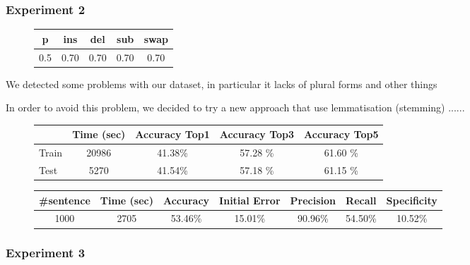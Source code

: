 \subsubsection{Experiment 2}
\begin{figure}[H]
	\centering
	\begin{tabular}{ccccc}
		\toprule
		p 				 & ins 				 	& del  				&  sub 			   &   swap\\ \midrule
		\num{0.5} & \num{0,70} & \num{0,70}  & \num{0,70} & \num{0,70}\\
		\bottomrule
	\end{tabular}
	\label{tab:error_model2}
\end{figure}

We detected some problems with our dataset, in particular it lacks of plural forms and other things

In order to avoid this problem, we decided to try a new approach that use lemmatisation (stemming) ......

\begin{figure}[H]
	\centering
	\begin{tabular}{lcccc}
		\toprule
		& Time (sec)  & Accuracy Top1 & Accuracy Top3  &  Accuracy Top5 \\
		\midrule
		Train & \num{20986} & \num{41,38}\%  & \num{57,28} \% & \num{61,60} \% \\
		Test &	\num{5270}  & \num{41,54}\%  & \num{57,18} \% & \num{61,15} \%  \\
		\bottomrule
	\end{tabular}
	\label{tab:typo-eval2}
\end{figure}


\begin{figure}[H]
	\centering
	\begin{tabular}{ccccccc}
		\toprule
		\#sentence & Time (sec)  & Accuracy & Initial Error  &  Precision & Recall & Specificity \\
		\midrule
		\num{1000}	& \num{2705}  & \num{53,46}\%  & \num{15,01}\% & \num{90,96}\% & \num{54,50}\%  & 
		\num{10,52}\%  
		\\
		\bottomrule
	\end{tabular}
	\label{tab:sentence-eval2}
\end{figure}

\subsubsection{Experiment 3}

